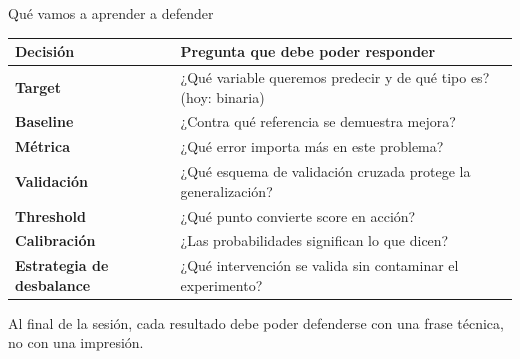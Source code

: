\documentclass[aspectratio=169,12pt]{beamer}
\newcommand{\hrow}{\rowcolor{mlcream}}
\begin{document}

\begin{frame}{Qué vamos a aprender a defender}
  \centering\footnotesize
  \begin{tabular}{@{}l L{0.7\textwidth}@{}}
    \toprule
    \hrow \textbf{Decisión} & Pregunta que debe poder responder \\
    \midrule
    \textbf{Target} & ¿Qué variable queremos predecir y de qué tipo es? (hoy: binaria) \\
    \textbf{Baseline} & ¿Contra qué referencia se demuestra mejora? \\
    \textbf{Métrica} & ¿Qué error importa más en este problema? \\
    \textbf{Validación} & ¿Qué esquema de validación cruzada protege la generalización? \\
    \textbf{Threshold} & ¿Qué punto convierte score en acción? \\
    \textbf{Calibración} & ¿Las probabilidades significan lo que dicen? \\
    \textbf{Estrategia de desbalance} & ¿Qué intervención se valida sin contaminar el experimento? \\
    \bottomrule
  \end{tabular}
  \vspace{4pt}

  Al final de la sesión, cada resultado debe poder defenderse con una frase técnica, no con una impresión.
\end{frame}
\end{document}
